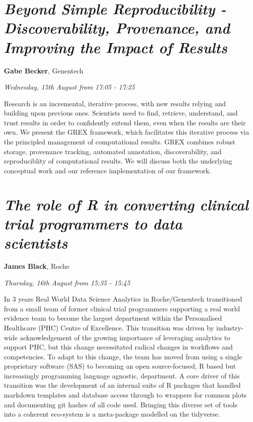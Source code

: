 \documentclass[]{book}
\theoremstyle{definition}
\theoremstyle{definition}
\theoremstyle{definition}
\theoremstyle{remark}
\begin{document}
\hypertarget{beyond-simple-reproducibility---discoverability-provenance-and-improving-the-impact-of-results}{%
\section{\texorpdfstring{\emph{Beyond Simple Reproducibility -
Discoverability, Provenance, and Improving the Impact of
Results}}{Beyond Simple Reproducibility - Discoverability, Provenance, and Improving the Impact of Results}}\label{beyond-simple-reproducibility---discoverability-provenance-and-improving-the-impact-of-results}}

\textbf{Gabe Becker}, Genentech

\emph{Wednesday, 15th August from 17:05 - 17:25}

Research is an incremental, iterative process, with new results relying
and building upon previous ones. Scientists need to find, retrieve,
understand, and trust results in order to confidently extend them, even
when the results are their own. We present the GREX framework, which
facilitates this iterative process via the principled management of
computational results. GREX combines robust storage, provenance
tracking, automated annotation, discoverability, and reproduciblity of
computational results. We will discuss both the underlying conceptual
work and our reference implementation of our framework.

\hypertarget{the-role-of-r-in-converting-clinical-trial-programmers-to-data-scientists}{%
\section{\texorpdfstring{\emph{The role of R in converting clinical
trial programmers to data
scientists}}{The role of R in converting clinical trial programmers to data scientists}}\label{the-role-of-r-in-converting-clinical-trial-programmers-to-data-scientists}}

\textbf{James Black}, Roche

\emph{Thursday, 16th August from 15:35 - 15:45}

In 3 years Real World Data Science Analytics in Roche/Genentech
transitioned from a small team of former clinical trial programmers
supporting a real world evidence team to become the largest department
within the Personalised Healthcare (PHC) Centre of Excellence. This
transition was driven by industry-wide acknowledgement of the growing
importance of leveraging analytics to support PHC, but this change
necessitated radical changes in workflows and competencies. To adapt to
this change, the team has moved from using a single proprietary software
(SAS) to becoming an open source-focused, R based but increasingly
programming language agnostic, department. A core driver of this
transition was the development of an internal suite of R packages that
handled markdown templates and database access through to wrappers for
common plots and documenting git hashes of all code used. Bringing this
diverse set of tools into a coherent eco-system is a meta-package
modelled on the tidyverse.
\end{document}
